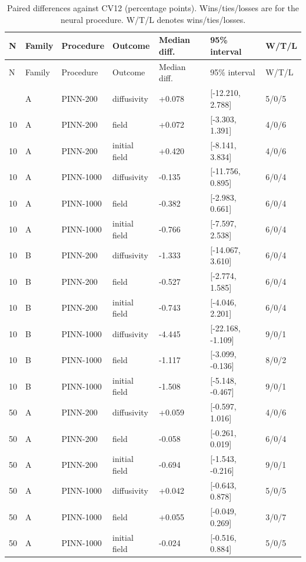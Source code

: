 \documentclass[10pt,a4paper]{article}
\begin{document}
\begingroup\small
\setlength{\tabcolsep}{3pt}
\begin{longtable}{@{}p{}p{}p{}p{}p{}p{}p{}@{}}
\caption{Paired differences against CV12 (percentage points). Wins/ties/losses are for the neural procedure. W/T/L denotes wins/ties/losses.}\label{tab:2}\\
\toprule
N & Family & Procedure & Outcome & Median diff. & 95\% interval & W/T/L \\
\midrule\endfirsthead
\toprule
N & Family & Procedure & Outcome & Median diff. & 95\% interval & W/T/L \\
\midrule\endhead
\bottomrule\endfoot
10 & A & PINN-200 & diffusivity & +0.078 & [-12.210, 2.788] & 5/0/5 \\
10 & A & PINN-200 & field & +0.072 & [-3.303, 1.391] & 4/0/6 \\
10 & A & PINN-200 & initial field & +0.420 & [-8.141, 3.834] & 4/0/6 \\
10 & A & PINN-1000 & diffusivity & -0.135 & [-11.756, 0.895] & 6/0/4 \\
10 & A & PINN-1000 & field & -0.382 & [-2.983, 0.661] & 6/0/4 \\
10 & A & PINN-1000 & initial field & -0.766 & [-7.597, 2.538] & 6/0/4 \\
10 & B & PINN-200 & diffusivity & -1.333 & [-14.067, 3.610] & 6/0/4 \\
10 & B & PINN-200 & field & -0.527 & [-2.774, 1.585] & 6/0/4 \\
10 & B & PINN-200 & initial field & -0.743 & [-4.046, 2.201] & 6/0/4 \\
10 & B & PINN-1000 & diffusivity & -4.445 & [-22.168, -1.109] & 9/0/1 \\
10 & B & PINN-1000 & field & -1.117 & [-3.099, -0.136] & 8/0/2 \\
10 & B & PINN-1000 & initial field & -1.508 & [-5.148, -0.467] & 9/0/1 \\
50 & A & PINN-200 & diffusivity & +0.059 & [-0.597, 1.016] & 4/0/6 \\
50 & A & PINN-200 & field & -0.058 & [-0.261, 0.019] & 6/0/4 \\
50 & A & PINN-200 & initial field & -0.694 & [-1.543, -0.216] & 9/0/1 \\
50 & A & PINN-1000 & diffusivity & +0.042 & [-0.643, 0.878] & 5/0/5 \\
50 & A & PINN-1000 & field & +0.055 & [-0.049, 0.269] & 3/0/7 \\
50 & A & PINN-1000 & initial field & -0.024 & [-0.516, 0.884] & 5/0/5 \\

\end{longtable}
\end{document}
